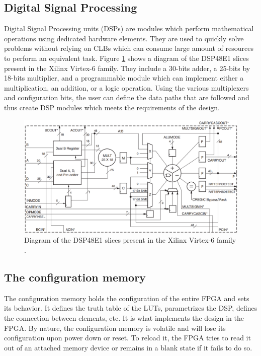     \subsection{Digital Signal Processing}

      Digital Signal Processing units (DSPs) \cite{VIRTEX-DSP} are modules which perform mathematical operations using dedicated hardware elements. They are used to quickly solve problems without relying on CLBs which can consume large amount of resources to perform an equivalent task. Figure \ref{fig:II-6-dsp} shows a diagram of the DSP48E1 slices present in the Xilinx Virtex-6 family. They include a 30-bits adder, a 25-bits by 18-bits multiplier, and a programmable module which can implement either a multiplication, an addition, or a logic operation. Using the various multiplexers and configuration bits, the user can define the data paths that are followed and thus create DSP modules which meets the requirements of the design.

      \begin{figure}[h!]
        \centering
        \includegraphics[width=\textwidth]{img/II-6-irradiation/dsp.png}
        \caption{Diagram of the DSP48E1 slices present in the Xilinx Virtex-6 family \cite{VIRTEX-DSP}.}
        \label{fig:II-6-dsp}
      \end{figure}

    \subsection{The configuration memory}

      The configuration memory holds the configuration of the entire FPGA and sets its behavior. It defines the truth table of the LUTs, parametrizes the DSP, defines the connection between elements, etc. It is what implements the design in the FPGA. By nature, the configuration memory is volatile and will lose its configuration upon power down or reset. To reload it, the FPGA tries to read it out of an attached memory device or remains in a blank state if it fails to do so.

